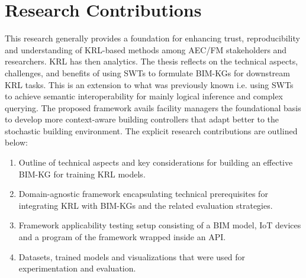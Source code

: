\section{Research Contributions}
This research generally provides a foundation for enhancing trust, reproducibility and understanding of \ac{KRL}-based methods
among AEC/FM stakeholders and researchers. \ac{KRL} has then analytics. The thesis reflects on the technical aspects, challenges, and benefits of using \acp{SWT} to formulate \acp{BIM-KG} for downstream \ac{KRL} tasks. This is an extension to what was previously known i.e. using \acp{SWT} to achieve semantic interoperability for mainly logical inference and complex querying. The proposed framework avails facility managers the foundational basis to develop more context-aware building controllers that adapt better to the stochastic building environment. The explicit research contributions are outlined below:

\begin{enumerate}

    \item 
    Outline of technical aspects and key considerations for building an effective \ac{BIM-KG} for training \ac{KRL} models.
    
    \item 
    Domain-agnostic framework encapsulating technical prerequisites for integrating \ac{KRL} with \acp{BIM-KG} and the related evaluation strategies.

    \item 
    Framework applicability testing setup consisting of a \ac{BIM} model, \ac{IoT} devices and a program of the framework wrapped inside an \ac{API}.

    \item
    Datasets, trained models and visualizations that were used for experimentation and evaluation.
     
\end{enumerate}

